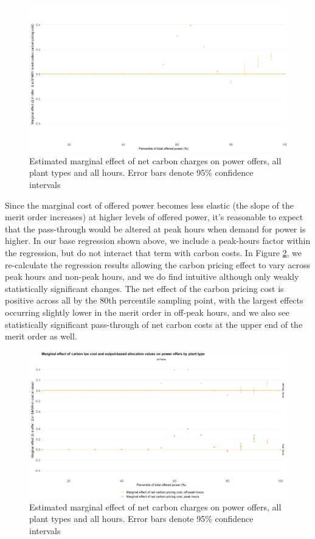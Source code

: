 \documentclass[12pt]{article}
\begin{document}
\begin{figure}[!htb]
    \centering
     \includegraphics[width=.9\textwidth]{../images/all_plants_net.png}
    \caption{Estimated marginal effect of net carbon charges on power offers, all plant types and all hours. Error bars denote 95\% confidence intervals}
    \label{fig:net_all}
\end{figure}


Since the marginal cost of offered power becomes less elastic (the slope of the merit order increases) at higher levels of offered power, it's reasonable to expect that the pass-through would be altered at peak hours when demand for power is higher. In our base regression shown above, we include a peak-hours factor within the regression, but do not interact that term with carbon costs. In Figure \ref{fig:net_peak}, we re-calculate the regression results allowing the carbon pricing effect to vary across peak hours and non-peak hours, and we do find intuitive although only weakly statistically significant changes. The net effect of the carbon pricing cost is positive across all by the 80th percentile sampling point, with the largest effects occurring slightly lower in the merit order in off-peak hours, and we also see statistically significant pass-through of net carbon costs at the upper end of the merit order as well.

\begin{figure}[!htb]
    \centering
     \includegraphics[width=.9\textwidth]{../images/all_plants_net_peak.png}
    \caption{Estimated marginal effect of net carbon charges on power offers, all plant types and all hours. Error bars denote 95\% confidence intervals}
    \label{fig:net_peak}
\end{figure}
\end{document}
